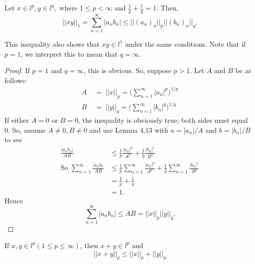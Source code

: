 \begin{lemma}
Let $x \in l^p, y \in l^q,$ where $1 \leq p < \infty$ and
$\frac{1}{p} + \frac{1}{q} = 1.$
Then,
\[||xy||_1 = \sum_{n=1}^{\infty} |a_nb_n| \leq ||(a_n)_n||_p||(b_n)_n||_q.\]
\end{lemma}

This inequality also shows that $xy \in l^1$ under the same conditions.  Note that if $p=1$, we interpret this to mean that $q = \infty$.

\begin{proof}
If $p=1$ and $q= \infty$, this is obvious.  So, suppose $p > 1$.  Let $A$ and $B$ be as follows:
\begin{align*}
A \; &= \; ||x||_p = \biggl(\sum_{n=1}^{\infty} |a_n|^p\biggr)^{1/p}\\
B \; &= \; ||y||_q = \biggl(\sum_{n=1}^{\infty} |b_n|^q\biggr)^{1/q}
\end{align*}
If either $A=0$ or $B=0$, the inequality is obviously true; both sides must equal 0.  So, assume $A \neq 0, B\neq 0$ and use Lemma 4.13 with $a = |a_n|/A$ and $b = |b_n|/B$ to see
\begin{align*}
\frac{|a_nb_n|}{AB} &\leq \frac{1}{p}\frac{|a_n|^p}{A^p} + \frac{1}{q}\frac{|b_n|^1}{B^q}\\
\textrm{So } \sum_{n=1}^{\infty} \frac{|a_nb_n}{AB} &\leq \frac{1}{p}\sum_{n=1}^{\infty}\frac{|a_n|^p}{A^p} + \frac{1}{q}\sum_{n=1}^{\infty}\frac{|b_n|^1}{B^q}\\
&= \frac{1}{p} + \frac{1}{q}\\
&= 1.
\end{align*}
Hence
\[\sum_{n=1}^{\infty}|a_nb_n| \leq AB = ||x||_p||y||_q.\]
\end{proof}

\begin{lemma}
If $x,y \in l^p (1 \leq p \leq \infty)$, then $x+y \in l^p$ and
\[||x+y||_p \leq ||x||_p + ||y||_p\]
\end{lemma}

